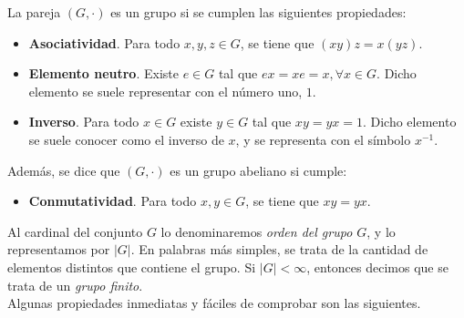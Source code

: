 \begin{definicion}
	La pareja $(G, \cdot)$ es un grupo si se cumplen las siguientes propiedades:
	
	\begin{itemize}
		\item \textbf{Asociatividad}. Para todo $x, y, z \in G$, se tiene que $(xy)z = x(yz)$.
		
		\item \textbf{Elemento neutro}. Existe $e \in G$ tal que $ex = xe = x, \forall x \in G$. Dicho elemento se suele representar con el número uno, $1$.
		
		\item \textbf{Inverso}. Para todo $x \in G$ existe $y \in G$ tal que $xy = yx = 1$. Dicho elemento se suele conocer como el inverso de $x$, y se representa con el símbolo $x^{-1}$.
	\end{itemize}
	
	Además, se dice que $(G, \cdot)$ es un grupo abeliano si cumple:
	
	\begin{itemize}
		\item \textbf{Conmutatividad}. Para todo $x, y \in G$, se tiene que $xy = yx$.
	\end{itemize}
\end{definicion}

Al cardinal del conjunto $G$ lo denominaremos \textit{orden del grupo $G$}, y lo representamos por $|G|$. En palabras más simples, se trata de la cantidad de elementos distintos que contiene el grupo. Si $|G| < \infty$, entonces decimos que se trata de un \textit{grupo finito}.\\

Algunas propiedades inmediatas y fáciles de comprobar son las siguientes.

